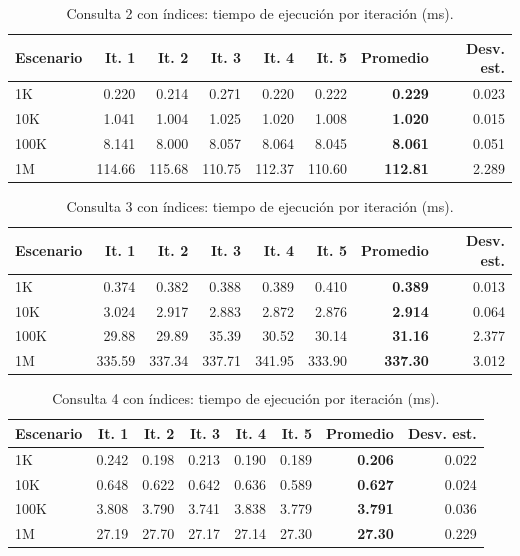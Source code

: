 \documentclass[11pt,letterpaper]{article}
\begin{document}
\begin{table}[H]
\centering\small
\begin{tabular}{lrrrrrrr}
\toprule
Escenario & It. 1 & It. 2 & It. 3 & It. 4 & It. 5 & Promedio & Desv. est. \\
\midrule
1K & 0.220 & 0.214 & 0.271 & 0.220 & 0.222 & \textbf{0.229} & 0.023 \\
10K & 1.041 & 1.004 & 1.025 & 1.020 & 1.008 & \textbf{1.020} & 0.015 \\
100K & 8.141 & 8.000 & 8.057 & 8.064 & 8.045 & \textbf{8.061} & 0.051 \\
1M & 114.66 & 115.68 & 110.75 & 112.37 & 110.60 & \textbf{112.81} & 2.289 \\
\bottomrule
\end{tabular}
\caption{Consulta 2 con índices: tiempo de ejecución por iteración (ms).}\label{tab:con2}
\end{table}

\begin{table}[H]
\centering\small
\begin{tabular}{lrrrrrrr}
\toprule
Escenario & It. 1 & It. 2 & It. 3 & It. 4 & It. 5 & Promedio & Desv. est. \\
\midrule
1K & 0.374 & 0.382 & 0.388 & 0.389 & 0.410 & \textbf{0.389} & 0.013 \\
10K & 3.024 & 2.917 & 2.883 & 2.872 & 2.876 & \textbf{2.914} & 0.064 \\
100K & 29.88 & 29.89 & 35.39 & 30.52 & 30.14 & \textbf{31.16} & 2.377 \\
1M & 335.59 & 337.34 & 337.71 & 341.95 & 333.90 & \textbf{337.30} & 3.012 \\
\bottomrule
\end{tabular}
\caption{Consulta 3 con índices: tiempo de ejecución por iteración (ms).}\label{tab:con3}
\end{table}

\begin{table}[H]
\centering\small
\begin{tabular}{lrrrrrrr}
\toprule
Escenario & It. 1 & It. 2 & It. 3 & It. 4 & It. 5 & Promedio & Desv. est. \\
\midrule
1K & 0.242 & 0.198 & 0.213 & 0.190 & 0.189 & \textbf{0.206} & 0.022 \\
10K & 0.648 & 0.622 & 0.642 & 0.636 & 0.589 & \textbf{0.627} & 0.024 \\
100K & 3.808 & 3.790 & 3.741 & 3.838 & 3.779 & \textbf{3.791} & 0.036 \\
1M & 27.19 & 27.70 & 27.17 & 27.14 & 27.30 & \textbf{27.30} & 0.229 \\
\bottomrule
\end{tabular}
\caption{Consulta 4 con índices: tiempo de ejecución por iteración (ms).}\label{tab:con4}
\end{table}
\end{document}
